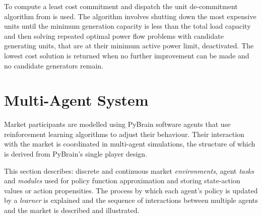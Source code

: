 To compute a least cost commitment and dispatch the unit de-commitment
algorithm from  is used.  The algorithm
involves shutting down the most expensive units until the
minimum generation capacity is less than the total load capacity and then
solving repeated optimal power flow problems with candidate generating units,
that are at their minimum active power limit, deactivated.  The lowest cost
solution is returned when no further improvement can be made and no candidate
generators remain.

%
%

\section{Multi-Agent System}
\label{sec:mas}
Market participants are modelled using PyBrain \cite{schaul:2010} software
agents that use reinforcement learning algorithms to adjust their behaviour.
Their interaction with the market is coordinated in multi-agent simulations, the
structure of which is derived from PyBrain's single player design.

This section describes: discrete and continuous market \textit{environments},
agent \textit{tasks} and \textit{modules} used for policy function
approximation and storing state-action values or action propensities.  The
process by which each agent's policy is updated by a \textit{learner} is
explained and the sequence of interactions between multiple agents and the
market is described and illustrated.


